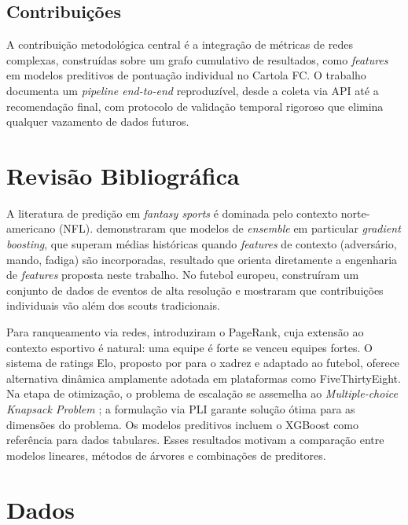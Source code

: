 \documentclass[12pt, a4paper, oneside]{article}
\begin{document}
\subsection{Contribuições}

A contribuição metodológica central é a integração de métricas de redes complexas,
construídas sobre um grafo cumulativo de resultados, como \textit{features} em modelos
preditivos de pontuação individual no Cartola FC. O trabalho documenta um
\textit{pipeline end-to-end} reproduzível, desde a coleta via API até a recomendação
final, com protocolo de validação temporal rigoroso que elimina qualquer vazamento de
dados futuros.

\section{Revisão Bibliográfica}
\label{sec:revisao}

A literatura de predição em \textit{fantasy sports} é dominada pelo contexto
norte-americano (NFL). \citet{beal2020} demonstraram que modelos de \textit{ensemble}
em particular \textit{gradient boosting}, que superam médias históricas quando
\textit{features} de contexto (adversário, mando, fadiga) são incorporadas, resultado
que orienta diretamente a engenharia de \textit{features} proposta neste trabalho.
No futebol europeu, \citet{pappalardo2019} construíram um conjunto de dados de eventos
de alta resolução e mostraram que contribuições individuais vão além dos scouts
tradicionais.

Para ranqueamento via redes, \citet{page1999} introduziram o PageRank, cuja extensão
ao contexto esportivo é natural: uma equipe é forte se venceu equipes fortes.
O sistema de ratings Elo, proposto por \citet{elo1978} para o xadrez e adaptado ao
futebol, oferece alternativa dinâmica amplamente adotada em plataformas como
FiveThirtyEight. Na etapa de otimização, o problema de escalação se assemelha ao
\textit{Multiple-choice Knapsack Problem} \citep{kellerer2004}; a formulação via PLI
garante solução ótima para as dimensões do problema. Os modelos preditivos incluem
o XGBoost \citep{chen2016} como referência para dados tabulares. Esses resultados
motivam a comparação entre modelos lineares, métodos de árvores e combinações de
preditores.

\section{Dados}
\label{sec:dados}
\end{document}
